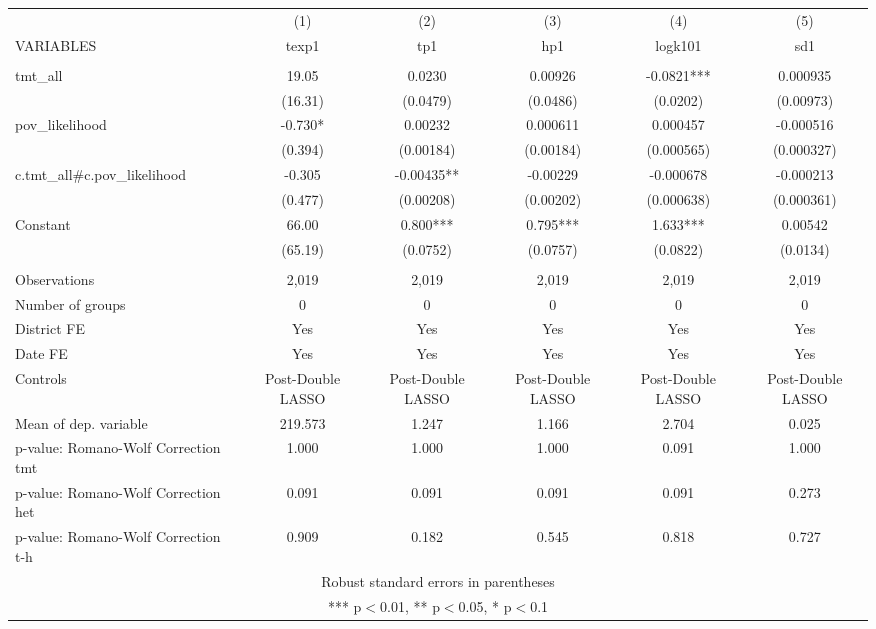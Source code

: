 \documentclass[]{article}
\begin{document}
\begin{tabular}{lccccc} \hline
 & (1) & (2) & (3) & (4) & (5) \\
VARIABLES & texp1 & tp1 & hp1 & logk101 & sd1 \\ \hline
 &  &  &  &  &  \\
tmt\_all & 19.05 & 0.0230 & 0.00926 & -0.0821*** & 0.000935 \\
 & (16.31) & (0.0479) & (0.0486) & (0.0202) & (0.00973) \\
pov\_likelihood & -0.730* & 0.00232 & 0.000611 & 0.000457 & -0.000516 \\
 & (0.394) & (0.00184) & (0.00184) & (0.000565) & (0.000327) \\
c.tmt\_all\#c.pov\_likelihood & -0.305 & -0.00435** & -0.00229 & -0.000678 & -0.000213 \\
 & (0.477) & (0.00208) & (0.00202) & (0.000638) & (0.000361) \\
Constant & 66.00 & 0.800*** & 0.795*** & 1.633*** & 0.00542 \\
 & (65.19) & (0.0752) & (0.0757) & (0.0822) & (0.0134) \\
 &  &  &  &  &  \\
Observations & 2,019 & 2,019 & 2,019 & 2,019 & 2,019 \\
Number of groups & 0 & 0 & 0 & 0 & 0 \\
District FE & Yes & Yes & Yes & Yes & Yes \\
Date FE & Yes & Yes & Yes & Yes & Yes \\
Controls & Post-Double LASSO & Post-Double LASSO & Post-Double LASSO & Post-Double LASSO & Post-Double LASSO \\
Mean of dep. variable & 219.573 & 1.247 & 1.166 & 2.704 & 0.025 \\
p-value: Romano-Wolf Correction tmt & 1.000 & 1.000 & 1.000 & 0.091 & 1.000 \\
p-value: Romano-Wolf Correction het & 0.091 & 0.091 & 0.091 & 0.091 & 0.273 \\
 p-value: Romano-Wolf Correction t-h & 0.909 & 0.182 & 0.545 & 0.818 & 0.727 \\ \hline
\multicolumn{6}{c}{ Robust standard errors in parentheses} \\
\multicolumn{6}{c}{ *** p$<$0.01, ** p$<$0.05, * p$<$0.1} \\
\end{tabular}
\end{document}
